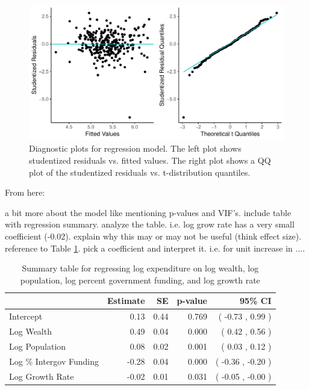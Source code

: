 \documentclass{article}\usepackage[]{graphicx}\usepackage[]{color}
\makeatletter
\def\maxwidth{ %
  \ifdim\Gin@nat@width>\linewidth
    \linewidth
  \else
    \Gin@nat@width
  \fi
}
\newenvironment{knitrout}{}{} %
\makeatother
\begin{document}
\begin{knitrout}
\color{fgcolor}\begin{figure}
\includegraphics[width=\maxwidth]{figure/r_diag_plots-1} \caption{\label{fig:diag} Diagnostic plots for regression model. The left plot shows studentized residuals vs. fitted values. The right plot shows a QQ plot of the studentized residuals vs. t-distribution quantiles.}\label{fig:r diag_plots}
\end{figure}


\end{knitrout}



From here: 


a bit more about the model like mentioning p-values and VIF's. include table with regression summary. analyze the table. i.e. log grow rate has a very small coefficient (-0.02). explain why this may or may not be useful (think effect size). reference to Table \ref{tbl:regress}. pick a coefficient and interpret it. i.e. for unit increase in ....


\begin{table}[ht]
\centering
\begin{tabular}{|l|rrrr|}
  \hline
 & Estimate & SE & p-value & 95\% CI \\ 
  \hline
Intercept & 0.13 & 0.44 & 0.769 & ( -0.73 , 0.99 ) \\ 
  Log Wealth & 0.49 & 0.04 & 0.000 & ( 0.42 , 0.56 ) \\ 
  Log Population & 0.08 & 0.02 & 0.001 & ( 0.03 , 0.12 ) \\ 
  Log \% Intergov Funding & -0.28 & 0.04 & 0.000 & ( -0.36 , -0.20 ) \\ 
  Log Growth Rate & -0.02 & 0.01 & 0.031 & ( -0.05 , -0.00 ) \\ 
   \hline
\end{tabular}
\caption{Summary table for regressing log expenditure on 
         log wealth, log population, log percent government funding,
         and log growth rate} 
\label{tbl:regress}
\end{table}
\end{document}
